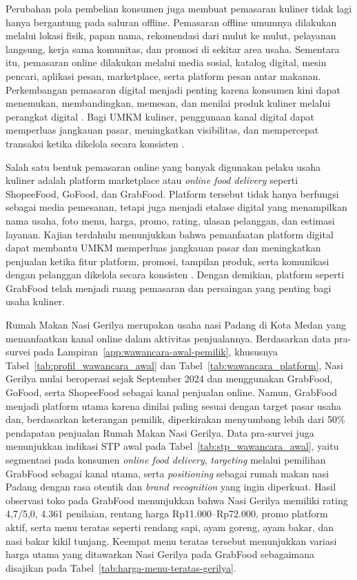 Perubahan pola pembelian konsumen juga membuat pemasaran kuliner tidak lagi hanya bergantung pada saluran offline. Pemasaran offline umumnya dilakukan melalui lokasi fisik, papan nama, rekomendasi dari mulut ke mulut, pelayanan langsung, kerja sama komunitas, dan promosi di sekitar area usaha. Sementara itu, pemasaran online dilakukan melalui media sosial, katalog digital, mesin pencari, aplikasi pesan, marketplace, serta platform pesan antar makanan. Perkembangan pemasaran digital menjadi penting karena konsumen kini dapat menemukan, membandingkan, memesan, dan menilai produk kuliner melalui perangkat digital \parencite{chaffey2022digitalmarketing,regina2025kuliner}. Bagi UMKM kuliner, penggunaan kanal digital dapat memperluas jangkauan pasar, meningkatkan visibilitas, dan mempercepat transaksi ketika dikelola secara konsisten \parencite{regina2025kuliner,roslam2021markisaaurora,suharjo2020bogorsnacks}.

Salah satu bentuk pemasaran online yang banyak digunakan pelaku usaha kuliner adalah platform marketplace atau \textit{online food delivery} seperti ShopeeFood, GoFood, dan GrabFood. Platform tersebut tidak hanya berfungsi sebagai media pemesanan, tetapi juga menjadi etalase digital yang menampilkan nama usaha, foto menu, harga, promo, rating, ulasan pelanggan, dan estimasi layanan. Kajian terdahulu menunjukkan bahwa pemanfaatan platform digital dapat membantu UMKM memperluas jangkauan pasar dan meningkatkan penjualan ketika fitur platform, promosi, tampilan produk, serta komunikasi dengan pelanggan dikelola secara konsisten \parencite{regina2025kuliner,sophia2025rendanggadih,suharjo2020bogorsnacks}. Dengan demikian, platform seperti GrabFood telah menjadi ruang pemasaran dan persaingan yang penting bagi usaha kuliner.

Rumah Makan Nasi Gerilya merupakan usaha nasi Padang di Kota Medan yang memanfaatkan kanal online dalam aktivitas penjualannya. Berdasarkan data pra-survei pada Lampiran~\ref{app:wawancara-awal-pemilik}, khususnya Tabel~\ref{tab:profil_wawancara_awal} dan Tabel~\ref{tab:wawancara_platform}, Nasi Gerilya mulai beroperasi sejak September 2024 dan menggunakan GrabFood, GoFood, serta ShopeeFood sebagai kanal penjualan online. Namun, GrabFood menjadi platform utama karena dinilai paling sesuai dengan target pasar usaha dan, berdasarkan keterangan pemilik, diperkirakan menyumbang lebih dari 50\% pendapatan penjualan Rumah Makan Nasi Gerilya. Data pra-survei juga menunjukkan indikasi STP awal pada Tabel~\ref{tab:stp_wawancara_awal}, yaitu segmentasi pada konsumen \textit{online food delivery}, \textit{targeting} melalui pemilihan GrabFood sebagai kanal utama, serta \textit{positioning} sebagai rumah makan nasi Padang dengan rasa otentik dan \textit{brand recognition} yang ingin diperkuat. Hasil observasi toko pada GrabFood menunjukkan bahwa Nasi Gerilya memiliki rating 4,7/5,0, 4.361 penilaian, rentang harga Rp11.000--Rp72.000, promo platform aktif, serta menu teratas seperti rendang sapi, ayam goreng, ayam bakar, dan nasi bakar kikil tunjang. Keempat menu teratas tersebut menunjukkan variasi harga utama yang ditawarkan Nasi Gerilya pada GrabFood sebagaimana disajikan pada Tabel~\ref{tab:harga-menu-teratas-gerilya}.

